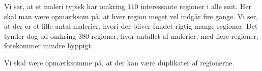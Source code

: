 {Vi ser, at et maleri typisk har omkring $110$ interessante regioner i
alle snit. Her skal man være opmærksom på, at hver region meget vel
indgår fire gange. Vi ser, at der er et lille antal malerier, hvori der
bliver fundet rigtig mange regioner. Det tynder dog ud omkring
$380$ regioner, hvor antallet af malerier, med flere regioner,
forekommer mindre hyppigt.

Vi skal være opmærksomme på, at der kan være duplikater af regionerne.

}

